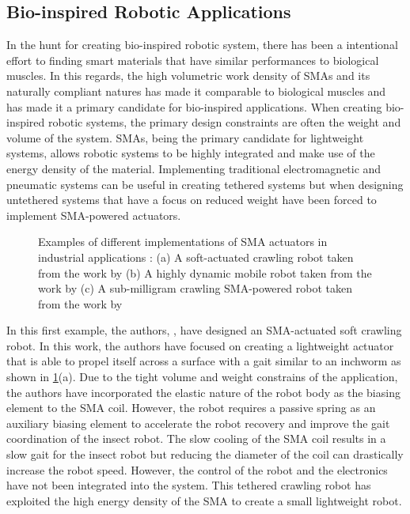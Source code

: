 \subsection{Bio-inspired Robotic Applications}
In the hunt for creating bio-inspired robotic system, there has been a intentional effort to finding smart materials that have similar performances to biological muscles. In this regards, the high volumetric work density of SMAs and its naturally compliant natures has made it comparable to biological muscles and has made it a primary candidate for bio-inspired applications. When creating bio-inspired robotic systems, the primary design constraints are often the weight and volume of the system. SMAs, being the primary candidate for lightweight systems, allows robotic systems to be highly integrated and make use of the energy density of the material. Implementing traditional electromagnetic and pneumatic systems can be useful in creating tethered systems but when designing untethered systems that have a focus on reduced weight have been forced to implement SMA-powered actuators.

\begin{figure}[hbt!]
    \centering
    
    \caption{Examples of different implementations of SMA actuators in industrial applications : (a) A soft-actuated crawling robot taken from the work by \cite{liangShapeMemoryAlloy2020} (b) A highly dynamic mobile robot taken from the work by \cite{huangHighlyDynamicShape2019} (c) A sub-milligram crawling SMA-powered robot taken from the work by \cite{yang88milligramInsectscaleAutonomous2020a}}
    \label{fig:bio-examples}
\end{figure}

In this first example, the authors, \cite{liangShapeMemoryAlloy2020}, have designed an SMA-actuated soft crawling robot. In this work, the authors have focused on creating a lightweight actuator that is able to propel itself across a surface with a gait similar to an inchworm as shown in \cref{fig:bio-examples}(a). Due to the tight volume and weight constrains of the application, the authors have incorporated the elastic nature of the robot body as the biasing element to the SMA coil. However, the robot requires a passive spring as an auxiliary biasing element to accelerate the robot recovery and improve the gait coordination of the insect robot. The slow cooling of the SMA coil results in a slow gait for the insect robot but reducing the diameter of the coil can drastically increase the robot speed. However, the control of the robot and the electronics have not been integrated into the system. This tethered crawling robot has exploited the high energy density of the SMA to create a small lightweight robot.

